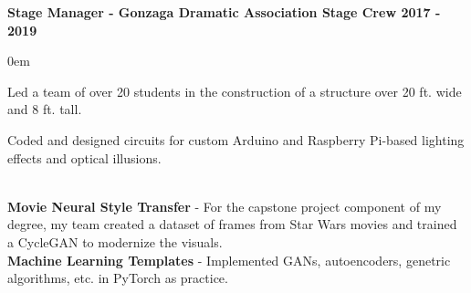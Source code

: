 \documentclass{article}
\begin{document}
\begin{center}
\begin{flushleft}
    \textbf{Stage Manager - Gonzaga Dramatic Association Stage Crew \hfill 2017 - 2019}
    \begin{compactitem}
      \itemsep0em
      \item Led a team of over 20 students in the construction of a structure over 20 ft. wide and 8 ft. tall.
      \item Coded and designed circuits for custom Arduino and Raspberry Pi-based lighting effects and optical illusions.
    \end{compactitem}

    {\large\textbf{\underline{}}} \\
    \textbf{Movie Neural Style Transfer} - For the capstone project component of my degree, my team created a dataset of frames from Star Wars movies and trained a CycleGAN to modernize the visuals. \\
    \textbf{Machine Learning Templates} - Implemented GANs, autoencoders, genetric algorithms, etc. in PyTorch as practice. \\

  \end{flushleft}
\end{center}
\end{document}
